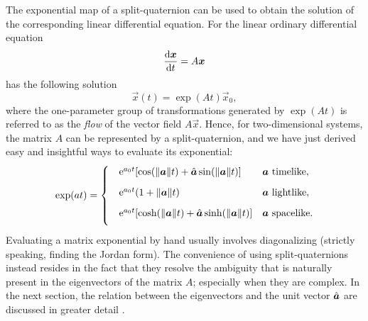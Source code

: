 The exponential map of a split-quaternion can be used to obtain the solution of the corresponding linear differential equation. For the linear ordinary differential equation
\begin{equation}
     \dv{\vec{x}}{t} = A\vec{x}
\end{equation}
has the following solution \cite{Arnold1984}
\begin{equation}
     \vec{x}(t) = \exp(At)\vec{x}_0,
\end{equation}
where the one-parameter group of transformations generated by \(\exp(A t)\) is referred to as the \emph{flow} of the vector field \(A\vec{x}\). Hence, for two-dimensional systems, the matrix \(A\) can be represented by a split-quaternion, and we have just derived easy and insightful ways to evaluate its exponential: 
\begin{equation}
    \exp(a t) = 
    \begin{cases}
        \phantom \quad \ec^{a_0 t}\qty[\cos(\norm{\vec{a}} t) + \uvec{a}\sin(\norm{\vec{a}} t)] & \vec{a} \text{ timelike}, \\[1.5ex]
        \phantom \quad \ec^{a_0 t}\qty(1 + \norm{\vec{a}}t ) & \vec{a} \text{ lightlike}, \\[1.5ex]
        \phantom \quad \ec^{a_0 t}\qty[\cosh(\norm{\vec{a}} t) + \uvec{a}\sinh(\norm{\vec{a}} t)] & \vec{a} \text{ spacelike}. \\[1.5ex]
    \end{cases}
    \label{eq:system_solution}
\end{equation}
Evaluating a matrix exponential by hand usually involves diagonalizing (strictly speaking, finding the Jordan form). The convenience of using split-quaternions instead resides in the fact that they resolve the ambiguity that is naturally present in the eigenvectors of the matrix \(A\); especially when they are complex. In the next section, the relation between the eigenvectors and the unit vector \(\uvec{a}\) are discussed in greater detail \cite{Moler2003}.
